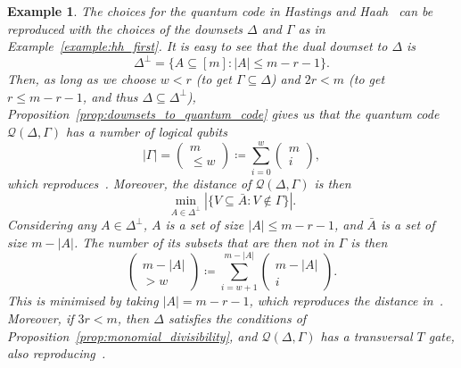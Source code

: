 \documentclass{article}
\newcounter{main}[section]
\newtheorem{example}[main]{Example}
\begin{document}
\begin{example}
    The choices for the quantum code in Hastings and Haah~\cite{hastings2018distillation} can be reproduced with the choices of the downsets $\Delta$ and $\Gamma$ as in Example~\ref{example:hh_first}. It is easy to see that the dual downset to $\Delta$ is
    \begin{equation}
        \Delta^\perp = \{A \subseteq [m]: |A| \leq m-r-1\}.
    \end{equation}
    Then, as long as we choose $w < r$ (to get $\Gamma \subseteq \Delta$) and $2r < m$ (to get $r \leq m-r-1$, and thus $\Delta \subseteq \Delta^\perp$), Proposition~\ref{prop:downsets_to_quantum_code} gives us that the quantum code $\mathcal{Q}(\Delta, \Gamma)$ has a number of logical qubits
    \begin{equation}
        |\Gamma| = \begin{pmatrix}
            m\\ \leq w
        \end{pmatrix} \coloneq \sum_{i=0}^w\begin{pmatrix}
            m\\i
        \end{pmatrix},
    \end{equation}
    which reproduces~\cite{hastings2018distillation}.
    Moreover, the distance of $\mathcal{Q}(\Delta, \Gamma)$ is then
    \begin{equation}
        \min_{A \in \Delta^\perp} |\{V \subseteq \bar{A}: V \notin \Gamma\}|.
    \end{equation}
    Considering any $A \in \Delta^\perp$, $A$ is a set of size $|A| \leq m-r-1$, and $\bar{A}$ is a set of size $m-|A|$. The number of its subsets that are then not in $\Gamma$ is then
    \begin{equation}
        \begin{pmatrix}
            m-|A|\\>w
        \end{pmatrix} \coloneq \sum_{i=w+1}^{m-|A|}\begin{pmatrix}
            m-|A|\\i
        \end{pmatrix}.
    \end{equation}
    This is minimised by taking $|A| = m-r-1$, which reproduces the distance in~\cite{hastings2018distillation}. Moreover, if $3r<m$, then $\Delta$ satisfies the conditions of Proposition~\ref{prop:monomial_divisibility}, and $\mathcal{Q}(\Delta, \Gamma)$ has a transversal $T$ gate, also reproducing~\cite{hastings2018distillation}.
\end{example}
\end{document}
